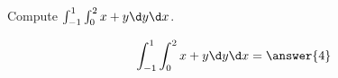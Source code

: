 \documentclass{ximera}
\author{David Guichard \and Neal Koblitz \and H. Jerome Keisler \and Albert Scheller \and Barry Balof \and Mike Wills \and Matthew Carr}
\begin{document}
\begin{exercise}




Compute $\int_{-1}^{1}\int_{0}^{2}x+y\d y\d x$.
\begin{prompt}
\[
\int_{-1}^{1}\int_{0}^{2}x+y\d y\d x=\answer{4}
\]
\end{prompt}



\end{exercise}
\end{document}
